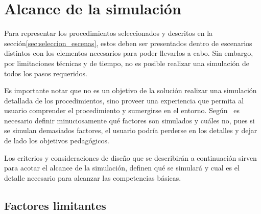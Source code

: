 \section{Alcance de la simulación}
\label{sec:alcance}

Para representar los procedimientos seleccionados y descritos en la
sección\ref{sec:seleccion_escenas}, estos deben ser presentados dentro de
escenarios distintos con los elementos necesarios para poder llevarlos a cabo.
Sin embargo, por limitaciones técnicas y de tiempo, no es posible
realizar una simulación de todos los pasos requeridos.


Es importante notar que no es un objetivo de la solución realizar una
simulación detallada de los procedimientos, sino proveer una experiencia que
permita al usuario comprender el procedimiento y sumergirse en el entorno.
Según~\cite{videojuegos:gonzaleztardon} es necesario definir minuciosamente
qué factores son simulados y cuáles no, pues si se simulan demasiados
factores, el usuario podría perderse en los detalles y dejar de lado los objetivos 
pedagógicos. 

Los criterios y consideraciones de diseño que se describirán a continuación sirven para acotar
el alcance de la simulación, definen qué se simulará y cual es el detalle
necesario para alcanzar las competencias básicas.



\subsection{Factores limitantes}


